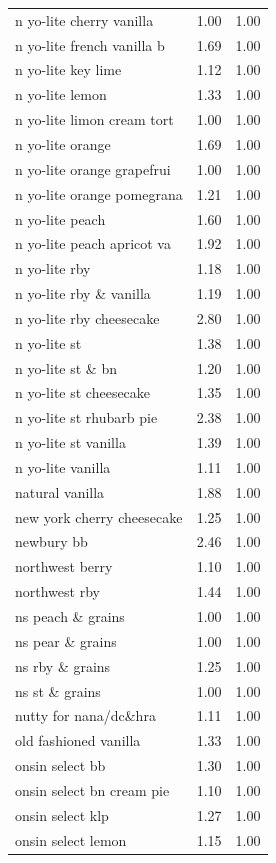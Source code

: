 \begin{table}
\begin{tabular}{lrr}
n yo-lite cherry vanilla & 1.00 & 1.00 \\
n yo-lite french vanilla b & 1.69 & 1.00 \\
n yo-lite key lime & 1.12 & 1.00 \\
n yo-lite lemon & 1.33 & 1.00 \\
n yo-lite limon cream tort & 1.00 & 1.00 \\
n yo-lite orange & 1.69 & 1.00 \\
n yo-lite orange grapefrui & 1.00 & 1.00 \\
n yo-lite orange pomegrana & 1.21 & 1.00 \\
n yo-lite peach & 1.60 & 1.00 \\
n yo-lite peach apricot va & 1.92 & 1.00 \\
n yo-lite rby & 1.18 & 1.00 \\
n yo-lite rby \& vanilla & 1.19 & 1.00 \\
n yo-lite rby cheesecake & 2.80 & 1.00 \\
n yo-lite st & 1.38 & 1.00 \\
n yo-lite st \& bn & 1.20 & 1.00 \\
n yo-lite st cheesecake & 1.35 & 1.00 \\
n yo-lite st rhubarb pie & 2.38 & 1.00 \\
n yo-lite st vanilla & 1.39 & 1.00 \\
n yo-lite vanilla & 1.11 & 1.00 \\
natural vanilla & 1.88 & 1.00 \\
new york cherry cheesecake & 1.25 & 1.00 \\
newbury bb & 2.46 & 1.00 \\
northwest berry & 1.10 & 1.00 \\
northwest rby & 1.44 & 1.00 \\
ns peach \& grains & 1.00 & 1.00 \\
ns pear \& grains & 1.00 & 1.00 \\
ns rby \& grains & 1.25 & 1.00 \\
ns st \& grains & 1.00 & 1.00 \\
nutty for nana/dc\&hra & 1.11 & 1.00 \\
old fashioned vanilla & 1.33 & 1.00 \\
onsin select bb & 1.30 & 1.00 \\
onsin select bn cream pie & 1.10 & 1.00 \\
onsin select klp & 1.27 & 1.00 \\
onsin select lemon & 1.15 & 1.00 \\

\end{tabular}
\end{table}
